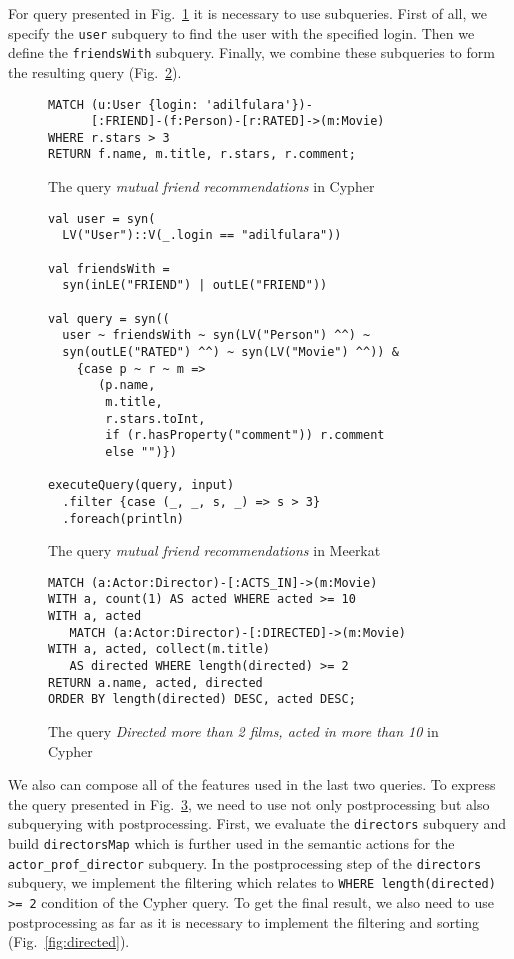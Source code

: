 For query presented in Fig.~\ref{fig:Q4_C} it is necessary to use subqueries.
First of all, we specify the \lstinline{user} subquery to find the user with the specified login.
Then we define the \lstinline{friendsWith} subquery.
Finally, we combine these subqueries to form the resulting query (Fig.~\ref{fig:Q4_M}).

\begin{figure}[h]
\begin{lstlisting}
MATCH (u:User {login: 'adilfulara'})-
      [:FRIEND]-(f:Person)-[r:RATED]->(m:Movie)
WHERE r.stars > 3
RETURN f.name, m.title, r.stars, r.comment;
\end{lstlisting}
\caption{The query \emph{mutual friend recommendations} in Cypher}
\label{fig:Q4_C}
\end{figure}


\begin{figure}[h]
\begin{lstlisting}
val user = syn(
  LV("User")::V(_.login == "adilfulara"))

val friendsWith =
  syn(inLE("FRIEND") | outLE("FRIEND"))

val query = syn((
  user ~ friendsWith ~ syn(LV("Person") ^^) ~
  syn(outLE("RATED") ^^) ~ syn(LV("Movie") ^^)) &
    {case p ~ r ~ m =>
       (p.name,
        m.title,
        r.stars.toInt,
        if (r.hasProperty("comment")) r.comment
        else "")})

executeQuery(query, input)
  .filter {case (_, _, s, _) => s > 3}
  .foreach(println)

\end{lstlisting}
\caption{The query \emph{mutual friend recommendations} in Meerkat}
\label{fig:Q4_M}
\end{figure}

\begin{figure}[h]
\begin{lstlisting}
MATCH (a:Actor:Director)-[:ACTS_IN]->(m:Movie)
WITH a, count(1) AS acted WHERE acted >= 10
WITH a, acted
   MATCH (a:Actor:Director)-[:DIRECTED]->(m:Movie)
WITH a, acted, collect(m.title)
   AS directed WHERE length(directed) >= 2
RETURN a.name, acted, directed
ORDER BY length(directed) DESC, acted DESC;
\end{lstlisting}
\caption{The query \emph{Directed more than 2 films, acted in more than 10} in Cypher}
\label{fig:Q3_C}
\end{figure}


We also can compose all of the features used in the last two queries.
To express the query presented in Fig.~\ref{fig:Q3_C}, we need to use not only postprocessing but also subquerying with postprocessing.
First, we evaluate the \lstinline{directors} subquery and build \lstinline{directorsMap} which is further used in the semantic actions for the \lstinline{actor_prof_director} subquery.
In the postprocessing step of the \lstinline{directors} subquery, we implement the filtering which relates to \lstinline{WHERE length(directed) >= 2} condition of the Cypher query.
To get the final result, we also need to use postprocessing as far as it is necessary to implement the filtering and sorting (Fig.~\ref{fig:directed}).

